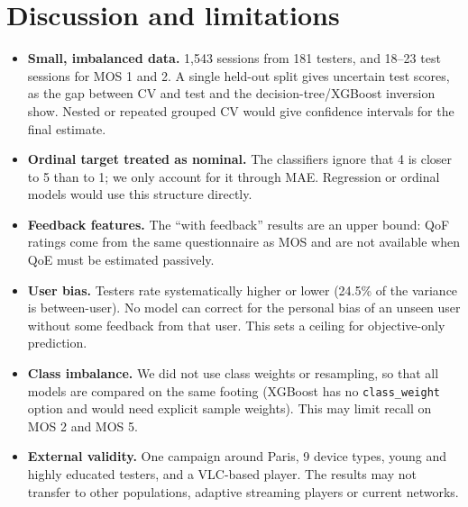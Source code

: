 \documentclass[11pt,a4paper]{article}
\newcommand{\code}[1]{\texttt{#1}}
\begin{document}
\begin{table}[ht]
  \centering\small
  \caption{Random vs.\ user-grouped CV for the selected models (training testers, 5$\times$5-fold CV,
           mean $\pm$ std over 25 folds).}
  \label{tab:split}
  
\end{table}

\section{Discussion and limitations}
\begin{itemize}
  \item \textbf{Small, imbalanced data.} 1{,}543 sessions from 181 testers, and 18--23 test sessions for
        MOS 1 and 2. A single held-out split gives uncertain test scores, as the gap between CV and test and
        the decision-tree/XGBoost inversion show. Nested or repeated grouped CV would give confidence
        intervals for the final estimate.
  \item \textbf{Ordinal target treated as nominal.} The classifiers ignore that 4 is closer to 5 than to 1;
        we only account for it through MAE. Regression or ordinal models would use this structure directly.
  \item \textbf{Feedback features.} The ``with feedback'' results are an upper bound: QoF ratings come from
        the same questionnaire as MOS and are not available when QoE must be estimated passively.
  \item \textbf{User bias.} Testers rate systematically higher or lower (24.5\% of the variance is
        between-user). No model can correct for the personal bias of an unseen user without some feedback
        from that user. This sets a ceiling for objective-only prediction.
  \item \textbf{Class imbalance.} We did not use class weights or resampling, so that all models are
        compared on the same footing (XGBoost has no \code{class\_weight} option and would need explicit
        sample weights). This may limit recall on MOS 2 and MOS 5.
  \item \textbf{External validity.} One campaign around Paris, 9 device types, young and highly educated
        testers, and a VLC-based player. The results may not transfer to other populations, adaptive
        streaming players or current networks.
\end{itemize}
\end{document}
